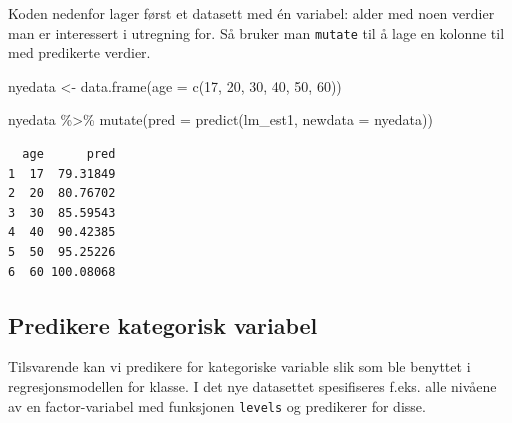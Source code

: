 \documentclass[
  letterpaper,
  DIV=11,
  numbers=noendperiod]{scrreprt}
\newenvironment{Shaded}{\begin{snugshade}}{\end{snugshade}}
\newcommand{\AttributeTok}[1]{\textcolor[rgb]{0.40,0.45,0.13}{#1}}
\newcommand{\DecValTok}[1]{\textcolor[rgb]{0.68,0.00,0.00}{#1}}
\newcommand{\FunctionTok}[1]{\textcolor[rgb]{0.28,0.35,0.67}{#1}}
\newcommand{\NormalTok}[1]{\textcolor[rgb]{0.00,0.23,0.31}{#1}}
\newcommand{\OtherTok}[1]{\textcolor[rgb]{0.00,0.23,0.31}{#1}}
\newcommand{\SpecialCharTok}[1]{\textcolor[rgb]{0.37,0.37,0.37}{#1}}
\theoremstyle{definition}
\theoremstyle{remark}
\begin{document}
Koden nedenfor lager først et datasett med én variabel: alder med noen
verdier man er interessert i utregning for. Så bruker man
\texttt{mutate} til å lage en kolonne til med predikerte verdier.

\begin{Shaded}
\begin{Highlighting}[]
\NormalTok{nyedata }\OtherTok{\textless{}{-}} \FunctionTok{data.frame}\NormalTok{(}\AttributeTok{age =} \FunctionTok{c}\NormalTok{(}\DecValTok{17}\NormalTok{, }\DecValTok{20}\NormalTok{, }\DecValTok{30}\NormalTok{, }\DecValTok{40}\NormalTok{, }\DecValTok{50}\NormalTok{, }\DecValTok{60}\NormalTok{))}

\NormalTok{nyedata }\SpecialCharTok{\%\textgreater{}\%} 
  \FunctionTok{mutate}\NormalTok{(}\AttributeTok{pred =} \FunctionTok{predict}\NormalTok{(lm\_est1, }\AttributeTok{newdata =}\NormalTok{ nyedata))}
\end{Highlighting}
\end{Shaded}

\begin{verbatim}
  age      pred
1  17  79.31849
2  20  80.76702
3  30  85.59543
4  40  90.42385
5  50  95.25226
6  60 100.08068
\end{verbatim}

\hypertarget{predikere-kategorisk-variabel}{%
\subsection{Predikere kategorisk
variabel}\label{predikere-kategorisk-variabel}}

Tilsvarende kan vi predikere for kategoriske variable slik som ble
benyttet i regresjonsmodellen for klasse. I det nye datasettet
spesifiseres f.eks. alle nivåene av en factor-variabel med funksjonen
\texttt{levels} og predikerer for disse.

\begin{Shaded}
\end{Shaded}
\end{document}

